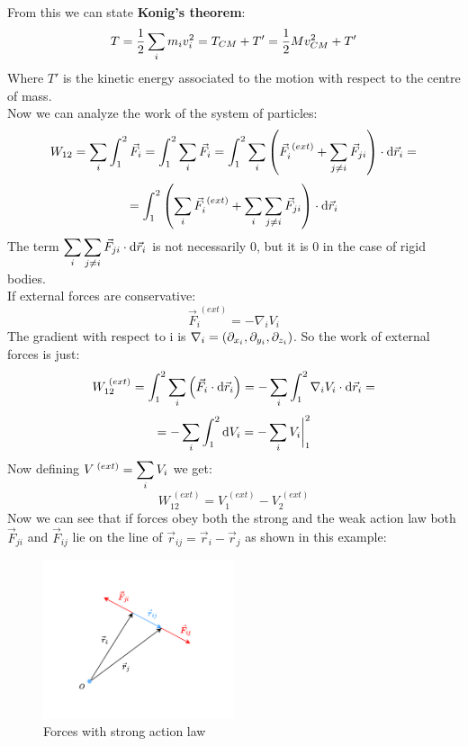 From this we can state \textbf{Konig's theorem}:
\begin{equation}
    T = \dfrac{1}{2}\displaystyle\sum_i m_i v_i^2 = T_{CM} + T' = \dfrac{1}{2}M v_{CM}^2 + T'
\end{equation}
Where $T'$ is the kinetic energy associated to the motion with respect to the centre of mass.\\
Now we can analyze the work of the system of particles:
\begin{equation}
    W_{12} = \displaystyle\sum_i\int_{1}^{2}\vec{F}_i = \int_{1}^{2}\displaystyle\sum_i\vec{F}_i = \int_{1}^{2}\displaystyle\sum_i\left(\vec{F}_i^{\;(ext)} + \displaystyle\sum_{j\neq i}\vec{F}_{ji}\right)\cdot \dd{\vec{r}_i} =
\end{equation}
\begin{equation}
    = \int_{1}^{2}\left(\displaystyle\sum_i\vec{F}_i^{\;(ext)} + \displaystyle\sum_i\displaystyle\sum_{j\neq i}\vec{F}_{ji}\right)\cdot \dd{\vec{r}_i}
\end{equation}
The term $\displaystyle\sum_i\displaystyle\sum_{j\neq i}\vec{F}_{ji}\cdot \dd{\vec{r}_i}$ is not necessarily 0, but it is 0 in the case of rigid bodies.\\
If external forces are conservative:
\begin{equation}
    \vec{F}_i^{\;(ext)} = -\nabla_i V_i
\end{equation}
The gradient with respect to i is $\nabla_i = \left(\partial_{x_i}, \partial_{y_i}, \partial_{z_i}\right)$. So the work of external forces is just:
\begin{equation}
    W_{12}^{\;(ext)} = \int_{1}^{2}\displaystyle\sum_i\left(\vec{F}_i\cdot\dd{\vec{r}_i}\right) = -\displaystyle\sum_i\int_{1}^{2}\nabla_i V_i\cdot\dd{\vec{r}_i} =
\end{equation}
\begin{equation}
    = -\displaystyle\sum_i\int_{1}^{2}\dd{V_i} = -\displaystyle\sum_i V_i\bigg|_1^2
\end{equation}
Now defining $V^{\;(ext)} = \displaystyle\sum_i V_i$ we get:
\begin{equation}
    W_{12}^{\;(ext)} = V^{\;(ext)}_1 - V^{\;(ext)}_2
\end{equation}
Now we can see that if forces obey both the strong and the weak action law both $\vec{F}_{ji}$ and $\vec{F}_{ij}$ lie on the line of $\vec{r}_{ij} = \vec{r}_i-\vec{r}_j$ as shown in this example:
\begin{figure}[H]
    \centering
    \includegraphics[width=0.5\textwidth]{res/svg/forcesstronglaw.drawio}
    \caption{Forces with strong action law}
    \label{fig:image5}
\end{figure}
